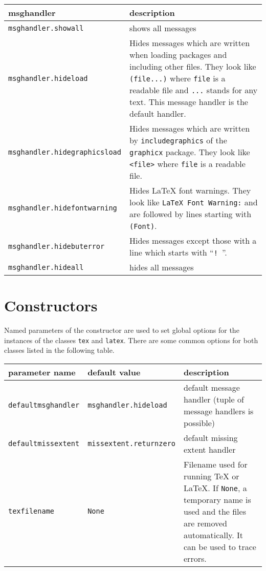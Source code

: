 \begin{description}
\smallskip
\begin{tabularx}{\linewidth}{l>{\raggedright\arraybackslash}X}
msghandler&description\\
\hline
\texttt{msghandler.showall}&shows all messages\\
\texttt{msghandler.hideload}&Hides messages which are written when loading
packages and including other files. They look like \texttt{(file...)}
where \texttt{file} is a readable file and \texttt{...} stands for any
text. This message handler is the default handler.\\
\texttt{msghandler.hidegraphicsload}&Hides messages which are written by
\texttt{includegraphics} of the \texttt{graphicx} package. They look like
\texttt{<file>} where \texttt{file} is a readable file.\\
\texttt{msghandler.hidefontwarning}&Hides \LaTeX{} font warnings. They
look like \texttt{LaTeX Font Warning:} and are followed by lines starting
with \texttt{(Font)}.\\
\texttt{msghandler.hidebuterror}&Hides messages except those
with a line which starts with ``\texttt{! }''.\\
\texttt{msghandler.hideall}&hides all messages\\
\end{tabularx}
\end{description}


\section{Constructors}
Named parameters of the constructor are used to set global options for
the instances of the classes \verb|tex| and \verb|latex|.
There are some common options for both classes listed in the following
table.

\smallskip
\begin{tabularx}{\linewidth}{ll>{\raggedright\arraybackslash}X}
parameter name&default value&description\\
\hline
\texttt{defaultmsghandler}&\texttt{msghandler.hideload}&default
message handler (tuple of message handlers is possible)\\
\texttt{defaultmissextent}&\texttt{missextent.returnzero}&default missing extent handler\\
\texttt{texfilename}&\texttt{None}&Filename used for running \TeX{} or
\LaTeX. If \texttt{None}, a temporary name is used and the files are
removed automatically. It can be used to trace errors.\\
\end{tabularx}
\smallskip

